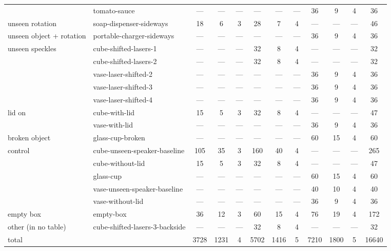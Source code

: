\begin{table}
\begin{tabular}{ll|ccc|ccc|ccc|c}
 & tomato-sauce & — & — & — & — & — & — & 36 & 9 & 4 & 36 \\
\cline{1-12}
unseen rotation & soap-dispenser-sideways & 18 & 6 & 3 & 28 & 7 & 4 & — & — & — & 46 \\
\cline{1-12}
unseen object + rotation & portable-charger-sideways & — & — & — & — & — & — & 36 & 9 & 4 & 36 \\
\cline{1-12}
\multirow[t]{5}{*}{unseen speckles} & cube-shifted-lasers-1 & — & — & — & 32 & 8 & 4 & — & — & — & 32 \\
 & cube-shifted-lasers-2 & — & — & — & 32 & 8 & 4 & — & — & — & 32 \\
 & vase-laser-shifted-2 & — & — & — & — & — & — & 36 & 9 & 4 & 36 \\
 & vase-laser-shifted-3 & — & — & — & — & — & — & 36 & 9 & 4 & 36 \\
 & vase-laser-shifted-4 & — & — & — & — & — & — & 36 & 9 & 4 & 36 \\
\cline{1-12}
\multirow[t]{2}{*}{lid on} & cube-with-lid & 15 & 5 & 3 & 32 & 8 & 4 & — & — & — & 47 \\
 & vase-with-lid & — & — & — & — & — & — & 36 & 9 & 4 & 36 \\
\cline{1-12}
broken object & glass-cup-broken & — & — & — & — & — & — & 60 & 15 & 4 & 60 \\
\cline{1-12}
\multirow[t]{5}{*}{control} & cube-unseen-speaker-baseline & 105 & 35 & 3 & 160 & 40 & 4 & — & — & — & 265 \\
 & cube-without-lid & 15 & 5 & 3 & 32 & 8 & 4 & — & — & — & 47 \\
 & glass-cup & — & — & — & — & — & — & 60 & 15 & 4 & 60 \\
 & vase-unseen-speaker-baseline & — & — & — & — & — & — & 40 & 10 & 4 & 40 \\
 & vase-without-lid & — & — & — & — & — & — & 36 & 9 & 4 & 36 \\
\cline{1-12}
empty box & empty-box & 36 & 12 & 3 & 60 & 15 & 4 & 76 & 19 & 4 & 172 \\
\cline{1-12}
other (in no table) & cube-shifted-lasers-3-backside & — & — & — & 32 & 8 & 4 & — & — & — & 32 \\
\cline{1-12}
total &  & 3728 & 1231 & 4 & 5702 & 1416 & 5 & 7210 & 1800 & 5 & 16640 \\
\bottomrule
\end{tabular}
\end{table}
